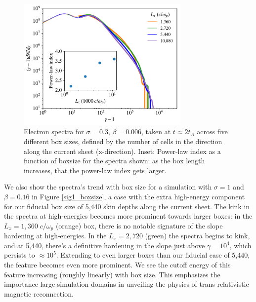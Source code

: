 \begin{figure}[!h]
	\centering
	\includegraphics[width =0.75\textwidth]{sig_3_delgam001_boxsize.pdf}
	\caption{Electron spectra for $\sigma=0.3$, $\beta=0.006$, taken at $t\approx 2t_{A}$ across five different box sizes, defined by the number of cells in the direction along the current sheet (x-direction). Inset: Power-law index as a function of boxsize for the spectra shown: as the box length increases, that the power-law index gets larger.}
	\label{sigpoint3_boxsize}
\end{figure}


We also show the spectra's trend with box size for a simulation with $\sigma=1$ and $\beta=0.16$ in Figure \ref{sig1_boxsize}, a case with the extra high-energy component for our fiducial box size of 5,440 skin depths along the current sheet.  The kink in the spectra at high-energies becomes more prominent towards larger boxes: in the $L_{x}=1,360 \; c/\omega_{p}$ (orange) box, there is no notable signature of the slope hardening at high-energies. In the $L_{x}=2,720$ (green) the spectra begins to kink, and at 5,440, there's a definitive hardening in the slope just above $\gamma=10^{4}$, which persists to $\approx 10^{5}$.  Extending to even larger boxes than our fiducial case of 5,440, the feature becomes even more prominent.  We see the cutoff energy of this feature increasing (roughly linearly) with box size.  This emphasizes the importance large simulation domains in unveiling the physics of trans-relativistic magnetic reconnection.




